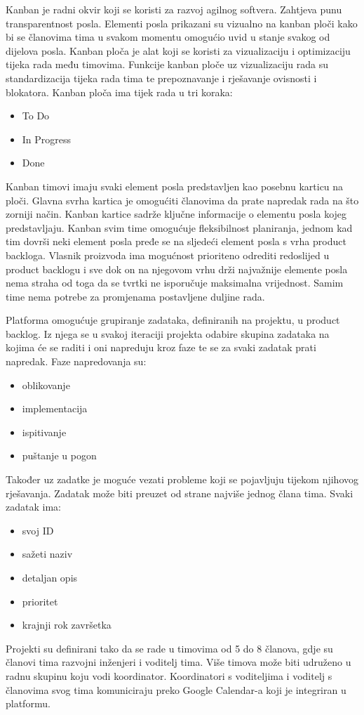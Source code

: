 \par Kanban je radni okvir koji se koristi za razvoj agilnog softvera. Zahtjeva punu transparentnost posla. Elementi posla prikazani su vizualno na kanban ploči kako bi se članovima tima u svakom momentu omogućio uvid u stanje svakog od dijelova posla. Kanban ploča je alat koji se koristi za vizualizaciju i optimizaciju tijeka rada među timovima. Funkcije kanban ploče uz vizualizaciju rada su standardizacija tijeka rada tima te prepoznavanje i rješavanje ovisnosti i blokatora. Kanban ploča ima tijek rada u tri koraka:
\begin{itemize}
			\item To Do
			\item In Progress
			\item Done
	\end{itemize}
Kanban timovi imaju svaki element posla predstavljen kao posebnu karticu na ploči. Glavna svrha kartica je omogućiti članovima da prate napredak rada na što zorniji način. Kanban kartice sadrže ključne informacije o elementu posla kojeg predstavljaju. Kanban svim time omogućuje fleksibilnost planiranja, jednom kad tim dovrši neki element posla pređe se na sljedeći element posla s vrha product backloga. Vlasnik proizvoda ima mogućnost prioriteno odrediti redoslijed u product backlogu i sve dok on na njegovom vrhu drži najvažnije elemente posla nema straha od toga da se tvrtki ne isporučuje maksimalna vrijednost. Samim time nema potrebe za promjenama postavljene duljine rada. 
\par Platforma omogućuje grupiranje zadataka, definiranih na projektu, u product backlog. Iz njega se u svakoj iteraciji projekta odabire skupina zadataka na kojima će se raditi i oni napreduju kroz faze te se za svaki zadatak prati napredak. Faze napredovanja su:
\begin{itemize}
			\item oblikovanje
			\item implementacija 
			\item ispitivanje
			\item puštanje u pogon
		
		\end{itemize} 
Također uz zadatke je moguće vezati probleme koji se pojavljuju tijekom njihovog rješavanja. Zadatak može biti preuzet od strane najviše jednog člana tima. Svaki zadatak ima:
\begin{itemize}
			\item svoj ID
			\item sažeti naziv 
			\item detaljan opis
			\item prioritet
			\item krajnji rok završetka
		
		\end{itemize} 
\par Projekti su definirani tako da se rade u timovima od 5 do 8 članova, gdje su članovi tima razvojni inženjeri i voditelj tima. Više timova može biti udruženo u radnu skupinu koju vodi koordinator. Koordinatori s voditeljima i voditelj s članovima svog tima komuniciraju preko Google Calendar-a koji je integriran u platformu.

